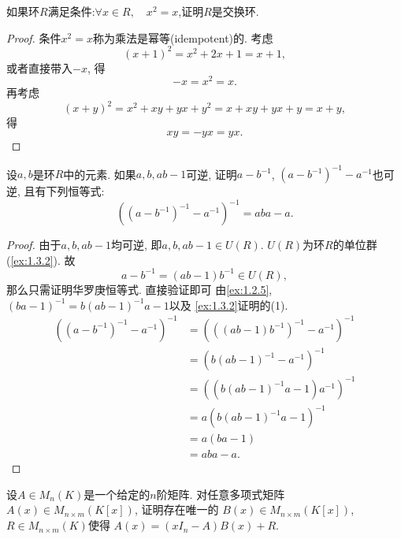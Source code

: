 \begin{problem}\label{ex:1.2.6}
    如果环$R$满足条件:$\forall x \in R,\quad x^2 = x$,证明$R$是交换环.
\end{problem}

\begin{proof}
    条件$x^2 = x$称为乘法是幂等(idempotent)的. 考虑
    \[
        (x + 1)^2 = x^2 + 2x + 1 = x + 1,
    \]
    或者直接带入$-x$,
    得
    \[
        -x = x^2 = x.
    \]
    再考虑
    \[
        (x + y)^2 = x^2 + xy + yx + y^2 = x + xy + yx + y = x + y,
    \]
    得
    \[
        xy = -yx = yx.
    \]
\end{proof}

\begin{problem}[华罗庚恒等式]
    设$a, b$是环$R$中的元素. 如果$a, b, ab - 1$可逆, 
证明$a - b^{-1}$, $(a - b^{-1})^{-1} - a^{-1}$也可逆, 且有下列恒等式:
\[
    \left((a - b^{-1})^{-1} - a^{-1}\right)^{-1} = aba - a.
\]
\end{problem}

\begin{proof}
    由于$a, b, ab - 1$均可逆, 即$a, b, ab - 1 \in U(R)$.
$U(R)$为环$R$的单位群(\ref{ex:1.3.2}).
故
    \[
        a - b^{-1} = (ab - 1)b^{-1} \in U(R),
    \]
    那么只需证明华罗庚恒等式. 直接验证即可
    由\ref{ex:1.2.5}, $(ba - 1)^{-1} = b(ab - 1)^{-1}a - 1$以及
    \ref{ex:1.3.2}证明的(1).
    \[
    \begin{aligned}
        \left((a - b^{-1})^{-1} - a^{-1}\right)^{-1} &= \left(((ab - 1)b^{-1})^{-1} - a^{-1}\right)^{-1}\\
        &= (b(ab - 1)^{-1} - a^{-1})^{-1}\\
        &= \left((b(ab - 1)^{-1}a - 1)a^{-1}\right)^{-1}\\
        &= a(b(ab - 1)^{-1}a - 1)^{-1}\\
        &= a(ba - 1)\\
        &= aba - a.
    \end{aligned}
    \]
\end{proof}

\begin{problem}[多项式矩阵的带余除法]
    设$A \in M_n(K)$是一个给定的$n$阶矩阵.
对任意多项式矩阵$A(x) \in M_{n \times m}(K[x])$, 证明存在唯一的
$B(x) \in M_{n \times m}(K[x])$, $R \in M_{n \times m}(K)$使得
$A(x) = (xI_n - A)B(x) + R$.
\end{problem}


